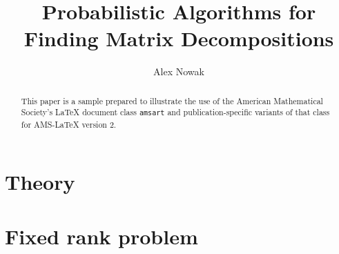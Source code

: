 \documentclass{amsart}
\theoremstyle{definition}
\theoremstyle{remark}
\numberwithin{equation}{section}
\begin{document}
\title{Probabilistic Algorithms for Finding Matrix Decompositions}

\author{Alex Nowak}






\begin{abstract}
This paper is a sample prepared to illustrate the use of the American
Mathematical Society's \LaTeX{} document class \texttt{amsart} and
publication-specific variants of that class for AMS-\LaTeX{} version 2.
\end{abstract}

\maketitle

\section*{Theory}

\section{Fixed rank problem}
\end{document}
